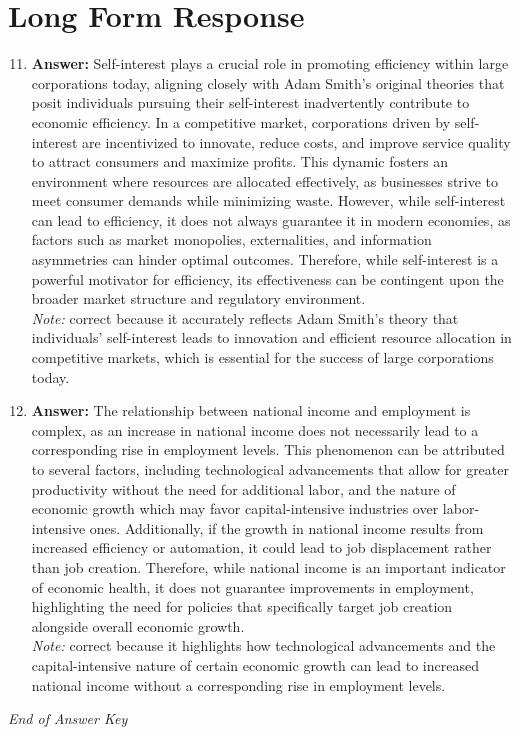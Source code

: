 \documentclass[12pt]{article}
\begin{document}
\section*{Long Form Response}
\begin{enumerate}[label=\arabic*.]
\setcounter{enumi}{10}
\item \textbf{Answer:} Self-interest plays a crucial role in promoting efficiency within large corporations today, aligning closely with Adam Smith's original theories that posit individuals pursuing their self-interest inadvertently contribute to economic efficiency. In a competitive market, corporations driven by self-interest are incentivized to innovate, reduce costs, and improve service quality to attract consumers and maximize profits. This dynamic fosters an environment where resources are allocated effectively, as businesses strive to meet consumer demands while minimizing waste. However, while self-interest can lead to efficiency, it does not always guarantee it in modern economies, as factors such as market monopolies, externalities, and information asymmetries can hinder optimal outcomes. Therefore, while self-interest is a powerful motivator for efficiency, its effectiveness can be contingent upon the broader market structure and regulatory environment.
\\ \textit{Note:} correct because it accurately reflects Adam Smith's theory that individuals' self-interest leads to innovation and efficient resource allocation in competitive markets, which is essential for the success of large corporations today.
\item \textbf{Answer:} The relationship between national income and employment is complex, as an increase in national income does not necessarily lead to a corresponding rise in employment levels. This phenomenon can be attributed to several factors, including technological advancements that allow for greater productivity without the need for additional labor, and the nature of economic growth which may favor capital-intensive industries over labor-intensive ones. Additionally, if the growth in national income results from increased efficiency or automation, it could lead to job displacement rather than job creation. Therefore, while national income is an important indicator of economic health, it does not guarantee improvements in employment, highlighting the need for policies that specifically target job creation alongside overall economic growth.
\\ \textit{Note:} correct because it highlights how technological advancements and the capital-intensive nature of certain economic growth can lead to increased national income without a corresponding rise in employment levels.
\end{enumerate}

\vfill
\noindent\textit{End of Answer Key}
\end{document}

